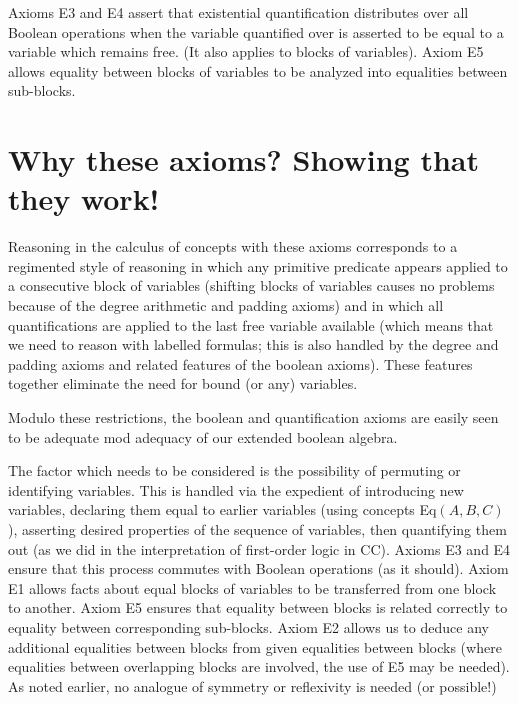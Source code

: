 Axioms E3 and E4 assert that existential quantification distributes
over all Boolean operations when the variable quantified over is
asserted to be equal to a variable which remains free.  (It also
applies to blocks of variables).  Axiom E5 allows equality between
blocks of variables to be analyzed into equalities between sub-blocks.

\section{Why these axioms?  Showing that they work!}

Reasoning in the calculus of concepts with these axioms corresponds to
a regimented style of reasoning in which any primitive predicate
appears applied to a consecutive block of variables (shifting blocks
of variables causes no problems because of the degree arithmetic and
padding axioms) and in which all quantifications are applied to the
last free variable available (which means that we need to reason with
labelled formulas; this is also handled by the degree and padding
axioms and related features of the boolean axioms). These features
together eliminate the need for bound (or any) variables.

Modulo these restrictions, the boolean and quantification axioms are
easily seen to be adequate mod adequacy of our extended boolean
algebra.

The factor which needs to be considered is the possibility of
permuting or identifying variables.  This is handled via the expedient
of introducing new variables, declaring them equal to earlier
variables (using concepts Eq$(A,B,C)$), asserting desired properties
of the sequence of variables, then quantifying them out (as we did in
the interpretation of first-order logic in CC).  Axioms E3 and E4
ensure that this process commutes with Boolean operations (as it
should).  Axiom E1 allows facts about equal blocks of variables to be
transferred from one block to another. Axiom E5 ensures that equality
between blocks is related correctly to equality between corresponding
sub-blocks.  Axiom E2 allows us to deduce any additional equalities
between blocks from given equalities between blocks (where equalities
between overlapping blocks are involved, the use of E5 may be needed).
As noted earlier, no analogue of symmetry or reflexivity is needed (or
possible!)











